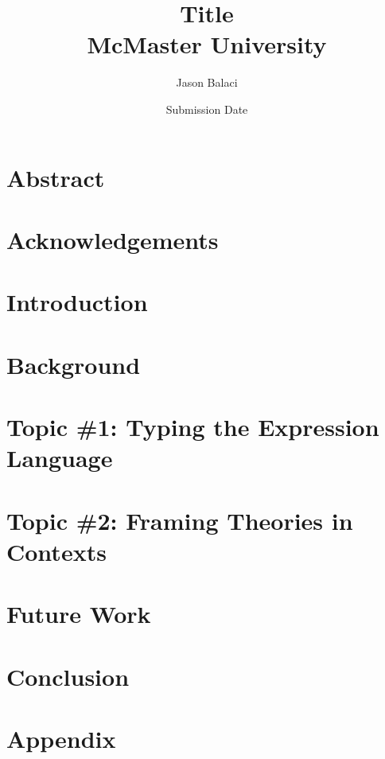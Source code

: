 \documentclass[12pt]{report}
\title{
    {Title}\\
    {McMaster University}
}
\author{Jason Balaci}
\date{Submission Date}
\begin{document}
    \todototoc
    \listoftodos

    \maketitle

    \chapter*{Abstract}
    

    \chapter*{Acknowledgements}
    

    \tableofcontents

    \chapter{Introduction}
    

    \chapter{Background}
    
    
    \chapter{Topic \#1: Typing the Expression Language}
    
    
    \chapter{Topic \#2: Framing Theories in Contexts}
    


    \chapter{Future Work}
    
    
    \chapter{Conclusion}
    

    \appendix
    \chapter{Appendix}
    

\end{document}
